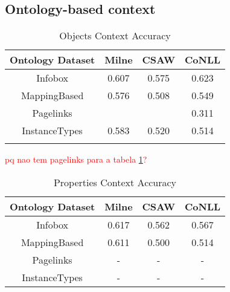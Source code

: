 \documentclass[10pt,a4paper]{article}
\newcommand{\todo}[1]{{\color{red}\textsf{\textbf{TODO}}: #1}}
\begin{document}

\subsection{Ontology-based context}





\begin{table}[ht] 
\caption{Objects Context Accuracy}
\centering
\begin{tabular}{c c c c}
\hline\hline 
Ontology Dataset	& Milne 	& CSAW 	& CoNLL \\ [0.5ex] 
\hline 
Infobox 			& 0.607	& 0.575	& 0.623 \\ 
MappingBased 		& 0.576 	& 0.508 	& 0.549 \\ 
Pagelinks 			&  		&  		& 0.311 \\ 
InstanceTypes 		& 0.583	& 0.520	& 0.514 \\  [1ex] 
\hline
\label{table:objectaccuracy} 
\end{tabular} 
\end{table} 

\textcolor{red}{pq nao tem pagelinks para a tabela \ref{table:objectaccuracy}?}

\begin{table}[ht] 
\caption{Properties Context Accuracy} 
\centering
\begin{tabular}{c c c c}
\hline\hline 
Ontology Dataset	& Milne 	& CSAW 	& CoNLL \\ [0.5ex] 
\hline 
Infobox 			& 0.617	& 0.562	& 0.567 \\ 
MappingBased 		& 0.611 	& 0.500 	& 0.514 \\ 
Pagelinks 			&  -		&  -		& - \\ 
InstanceTypes 		&  -		&  -		& - \\  [1ex] 
\hline
\end{tabular} 
\label{table:nonlin} 
\end{table} 
\end{document}
